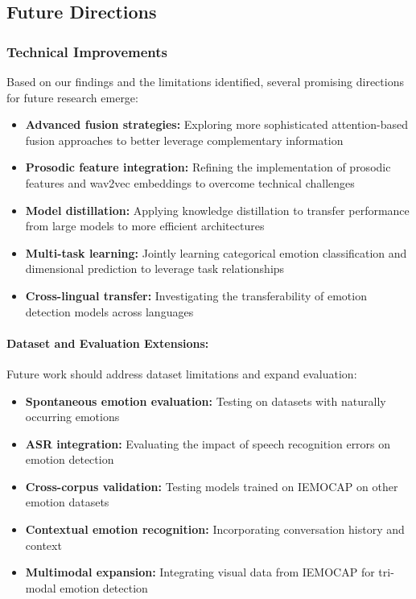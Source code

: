 \documentclass[12pt]{article}
\begin{document}
\subsection{Future Directions}
\subsubsection{Technical Improvements}
Based on our findings and the limitations identified, several promising directions for future research emerge:

\begin{itemize}
    \item \textbf{Advanced fusion strategies:} Exploring more sophisticated attention-based fusion approaches to better leverage complementary information
    
    \item \textbf{Prosodic feature integration:} Refining the implementation of prosodic features and wav2vec embeddings to overcome technical challenges
    
    \item \textbf{Model distillation:} Applying knowledge distillation to transfer performance from large models to more efficient architectures
    
    \item \textbf{Multi-task learning:} Jointly learning categorical emotion classification and dimensional prediction to leverage task relationships
    
    \item \textbf{Cross-lingual transfer:} Investigating the transferability of emotion detection models across languages
\end{itemize}

\paragraph{Dataset and Evaluation Extensions:}
Future work should address dataset limitations and expand evaluation:

\begin{itemize}
    \item \textbf{Spontaneous emotion evaluation:} Testing on datasets with naturally occurring emotions
    
    \item \textbf{ASR integration:} Evaluating the impact of speech recognition errors on emotion detection
    
    \item \textbf{Cross-corpus validation:} Testing models trained on IEMOCAP on other emotion datasets
    
    \item \textbf{Contextual emotion recognition:} Incorporating conversation history and context
    
    \item \textbf{Multimodal expansion:} Integrating visual data from IEMOCAP for tri-modal emotion detection
\end{itemize}
\end{document}
